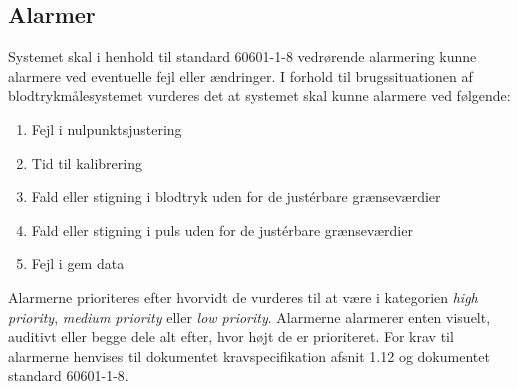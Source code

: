 \subsection{Alarmer}
Systemet skal i henhold til standard 60601-1-8 vedrørende alarmering kunne alarmere ved eventuelle fejl eller ændringer. I forhold til brugssituationen af blodtrykmålesystemet vurderes det at systemet skal kunne alarmere ved følgende:

\begin{enumerate}[1.]
	\item Fejl i nulpunktsjustering
	\item Tid til kalibrering
	\item Fald eller stigning i blodtryk uden for de justérbare grænseværdier
	\item Fald eller stigning i puls uden for de justérbare grænseværdier
	\item Fejl i gem data 
\end{enumerate}

Alarmerne prioriteres efter hvorvidt de vurderes til at være i kategorien \textit{high priority}, \textit{medium priority} eller \textit{low priority}. Alarmerne alarmerer enten visuelt, auditivt eller begge dele alt efter, hvor højt de er prioriteret. For krav til alarmerne henvises til dokumentet kravspecifikation afsnit 1.12 og dokumentet standard 60601-1-8. 

\clearpage 